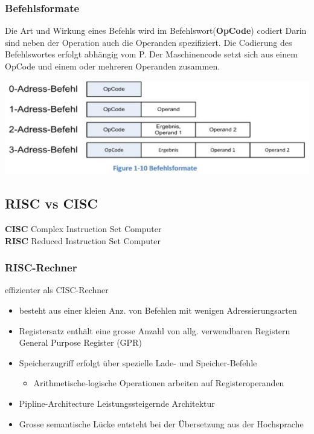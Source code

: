 \subsubsection{Befehlsformate}
\begin{multicols}{2}
\begin{minipage}{\linewidth}
Die Art und Wirkung eines Befehls wird im Befehlswort(\textbf{OpCode}) codiert
Darin sind neben der Operation auch die Operanden spezifiziert.
Die Codierung des Befehlswortes erfolgt abhängig vom \mu P.
Der Maschinencode setzt sich aus einem OpCode und einem oder mehreren Operanden zusammen.
\end{minipage}

\includegraphics[width=\linewidth]{images/Befehlsformate}
\end{multicols}


\subsection{RISC vs CISC}
\begin{multicols}{2}
    \textbf{CISC}\newline
    Complex Instruction Set Computer
    \\
    \textbf{RISC}\newline
    Reduced Instruction Set Computer
\end{multicols}
\subsubsection{RISC-Rechner}
effizienter als CISC-Rechner
\begin{itemize}
    \item besteht aus einer kleien Anz. von Befehlen mit wenigen Adressierungsarten
    \item Registersatz enthält eine grosse Anzahl von allg. verwendbaren Registern\newline
    General Purpose Register (GPR)
    \item Speicherzugriff erfolgt über spezielle Lade- und Speicher-Befehle
    \begin{itemize}
        \item Arithmetische-logische Operationen arbeiten auf Registeroperanden
    \end{itemize}
    \item Pipline-Architecture \leftarrow Leistungssteigernde Architektur
    \item Grosse semantische Lücke entsteht bei der Übersetzung aus der Hochsprache
\end{itemize}

